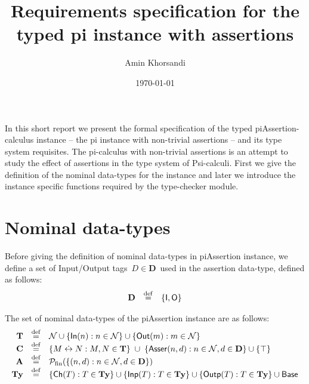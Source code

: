 \documentclass[11pt,a4paper]{article}
\title{Requirements specification for the typed pi instance with assertions}
\author{Amin Khorsandi}
\date{\today}
\theoremstyle{definition}
\begin{document}
\maketitle

In this short report we present the formal specification of the
typed piAssertion-calculus instance -- the pi instance with non-trivial assertions -- and its type
system requisites. The pi-calculus with non-trivial assertions is
an attempt to study the effect of assertions in the type system of Psi-calculi.
First we give the definition of the nominal data-types for the instance and later
we introduce the instance specific functions required by the type-checker module.

\section{Nominal data-types}

Before giving the definition of nominal data-types in piAssertion instance,
we define a set of Input/Output tags~$D\in\mathbf{D}$~used in
the assertion data-type, defined as follows:
\[
\begin{array}{rcl}
\mathbf{D} & \stackrel{\mathrm{def}}{=} & \{\mathsf{I,O}\}\\
\end{array}
\]

The set of nominal data-types of the piAssertion instance are as follows:
\[
\begin{array}{rcl}
\mathbf{T} & \defn & \N \cup \{\mathsf{In}(n) : n \in \N\} \cup \{\mathsf{Out}(m) : m \in \N\}\\
\mathbf{C} & \defn & \{M \sch N : M,N \in \mathbf{T} \}%
\;\cup\; \{\mathsf{Asser}(n,d) : n \in \N , d \in \textbf{D}\} \cup \{ \top \} \\
\mathbf{A} & \defn & \mathcal{P}_\mathrm{fin}(\{ (n,d) : n \in \N, d \in \mathbf{D} \}) \\
\mathbf{Ty} & \defn & \{ \mathsf{Ch}(T) : T \in \mathbf{Ty} \} 
\cup \{ \mathsf{Inp}(T) : T \in \mathbf{Ty} \} \cup \{ \mathsf{Outp}(T) : T \in \mathbf{Ty} \} \cup \mathsf{Base} \\
\end{array}
\]
\end{document}
